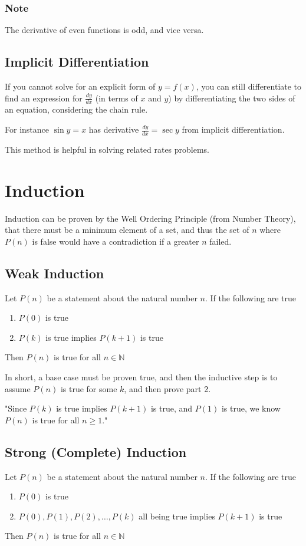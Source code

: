 \documentclass{article}
\begin{document}
\subsubsection{Note} The derivative of even functions is odd, and vice versa.

\subsection{Implicit Differentiation}
If you cannot solve for an explicit form of $y=f(x)$, you can still differentiate to find an expression for $\frac{dy}{dx}$ (in terms of $x$ and $y$) by differentiating the two sides of an equation, considering the chain rule.

For instance $\sin{y}=x$ has derivative $\frac{dy}{dx}=\sec{y}$ from implicit differentiation.

This method is helpful in solving related rates problems.

\section{Induction}
Induction can be proven by the Well Ordering Principle (from Number Theory), that there must be a minimum element of a set, and thus the set of $n$ where $P(n)$ is false would have a contradiction if a greater $n$ failed.

\subsection{Weak Induction}
Let $P(n)$ be a statement about the natural number $n$. If the following are true
\begin{enumerate}
    \item $P(0)$ is true
    \item $P(k)$ is true implies $P(k+1)$ is true
\end{enumerate}
Then $P(n)$ is true for all $n\in\mathbb{N}$

In short, a base case must be proven true, and then the inductive step is to assume $P(n)$ is true for some $k$, and then prove part 2.

"Since $P(k)$ is true implies $P(k+1)$ is true, and $P(1)$ is true, we know $P(n)$ is true for all $n\ge1$."

\subsection{Strong (Complete) Induction}
Let $P(n)$ be a statement about the natural number $n$. If the following are true
\begin{enumerate}
    \item $P(0)$ is true
    \item $P(0), P(1), P(2), \ldots, P(k)$ all being true implies $P(k+1)$ is true
\end{enumerate}
Then $P(n)$ is true for all $n\in\mathbb{N}$
\end{document}
